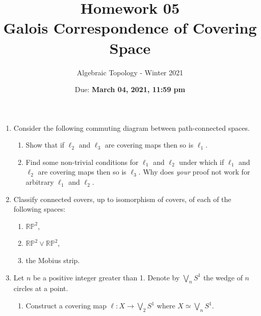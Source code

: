 \documentclass{article}
\title{Homework 05 \\ Galois Correspondence of Covering Space}
\author{Algebraic Topology - Winter 2021}
\date{Due: \textbf{March 04, 2021, 11:59 pm}}
\begin{document}
\maketitle

\begin{enumerate}
\item
  Consider the following commuting diagram between path-connected spaces.
  \begin{center}
  \end{center}
  \begin{enumerate}
  \item Show that if $\ell_2$ and $\ell_3$ are covering maps then so is $\ell_1$.
  \item Find some non-trivial conditions for $\ell_1$ and $\ell_2$ under which if $\ell_1$ and $\ell_2$ are covering
    maps then so is $\ell_3$. Why does \textit{your} proof not work for
    arbitrary $\ell_1$ and $\ell_2$.
  \end{enumerate}
\item Classify connected covers, up to isomorphism of covers, of each of the following
  spaces:
  \begin{enumerate}
  \item $\mathbb{RP}^2$,
  \item $\mathbb{RP}^2 \vee \mathbb{RP}^2$,
  \item the Mobius strip.
  \end{enumerate}
\item
  Let $n$ be a positive integer greater than 1. Denote by $\bigvee
  _{n}S^1$ the wedge of $n$ circles at a point.
  \begin{enumerate}
  \item Construct a covering map $\ell: X \to \bigvee _2 S^1$ where $X \simeq \bigvee _n S^1$.

\end{enumerate}
\end{enumerate}
\end{document}

